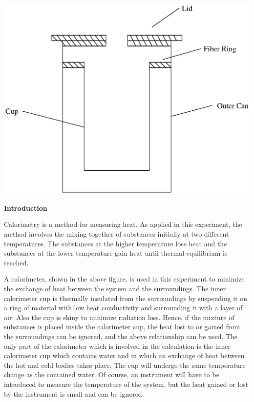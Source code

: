 \begin{minipage}{0.60\textwidth}
\includegraphics[width=\textwidth]{calorimetry/calorimetry_fig_1.eps}
\end{minipage}

\bigskip
\textbf{Introduction} 

Calorimetry is a method for measuring heat. As applied in this experiment,
the method involves the mixing together of substances initially at
two different temperatures. The substances at the higher temperature
lose heat and the substances at the lower temperature gain heat until
thermal equilibrium is reached.


A calorimeter, shown in the above figure, is used in this experiment
to minimize the exchange of heat between the system and the surroundings.
The inner calorimeter cup is thermally insulated from the surroundings
by suspending it on a ring of material with low heat conductivity
and surrounding it with a layer of air. Also the cup is shiny to minimize
radiation loss. Hence, if the mixture of substances is placed inside
the calorimeter cup, the heat lost to or gained from the surroundings
can be ignored, and the above relationship can be used. The only part
of the calorimeter which is involved in the calculation is the inner
calorimeter cup which contains water and in which an exchange of heat
between the hot and cold bodies takes place. The cup will undergo
the same temperature change as the contained water. Of course, an
instrument will have to be introduced to measure the temperature of
the system, but the heat gained or lost by the instrument is small
and can be ignored.

